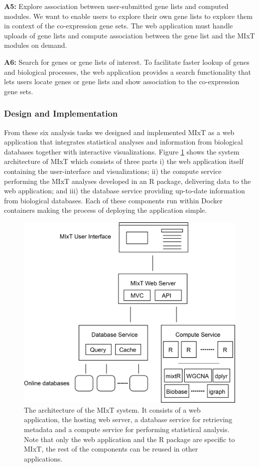 \textbf{A5:} Explore association between user-submitted gene lists and computed
modules. We want to enable users to explore their own gene lists to explore
them in context of the co-expression gene sets. The web application must handle
uploads of gene lists and compute association between the gene list and the MIxT
modules on demand. 

\textbf{A6:} Search for genes or gene lists of interest. To facilitate faster
lookup of genes and biological processes, the web application provides a search
functionality that lets users locate genes or gene lists and show association to
the co-expression gene sets. 

\subsubsection{Design and Implementation} 
From these six analysis tasks we designed and implemented MIxT as a web
application that integrates statistical analyses and information from biological
databases together with interactive visualizations. Figure \ref{kvik-mixt} shows
the system architecture of MIxT which consists of three parts i) the
web application itself containing the user-interface and visualizations; ii) the
compute service performing the MIxT analyses developed in an R package,
delivering data to the web application; and iii) the database service providing
up-to-date information from biological databases.  Each of these components run
within Docker containers making the process of deploying the application simple. 

\begin{figure}[h!]
\centering
\includegraphics[scale=0.4]{figures/mixt-architecture.png}
\caption{The architecture of the MIxT system. It consists of
a web application, the hosting web server, a database service for retrieving
metadata and a compute service for performing statistical analysis. Note that
only the web application and the R package are specific to MIxT, the rest of the
components can be reused in other applications.} 
\label{kvik-mixt}
\end{figure} 


